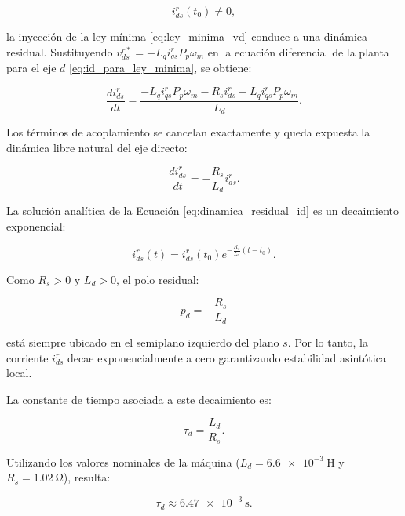 \documentclass[10pt,a4paper]{article}
\begin{document}
\begin{equation*}
    i_{ds}^r(t_0) \neq 0,
\end{equation*}

la inyección de la ley mínima \eqref{eq:ley_minima_vd} conduce a una dinámica residual. Sustituyendo $v_{ds}^{r*} = -L_q i_{qs}^r P_p \omega_m$ en la ecuación diferencial de la planta para el eje $d$ \eqref{eq:id_para_ley_minima}, se obtiene:

\begin{equation*}
	\frac{di_{ds}^{r}}{dt} = \frac{-L_q i_{qs}^r P_p \omega_m - R_s i_{ds}^r + L_q i_{qs}^r P_p \omega_m}{L_d}.
\end{equation*}

Los términos de acoplamiento se cancelan exactamente y queda expuesta la dinámica libre natural del eje directo:

\begin{equation}
    \boxed{ \frac{di_{ds}^{r}}{dt} = -\frac{R_s}{L_d}i_{ds}^r. }
    \label{eq:dinamica_residual_id}
\end{equation}

La solución analítica de la Ecuación \eqref{eq:dinamica_residual_id} es un decaimiento exponencial:

\begin{equation*}
    i_{ds}^r(t) = i_{ds}^r(t_0) e^{-\frac{R_s}{L_d}(t-t_0)}.
\end{equation*}

Como $R_s > 0$ y $L_d > 0$, el polo residual:

\begin{equation*}
    p_d = -\frac{R_s}{L_d}
\end{equation*}

está siempre ubicado en el semiplano izquierdo del plano $s$. 
Por lo tanto, la corriente $i_{ds}^r$ decae exponencialmente a cero garantizando estabilidad asintótica local.

La constante de tiempo asociada a este decaimiento es:

\begin{equation*}
    \tau_d = \frac{L_d}{R_s}.
\end{equation*}

Utilizando los valores nominales de la máquina ($L_d = \SI{6.6e-3}{\henry}$ y $R_s = \SI{1.02}{\ohm}$), resulta:

\begin{equation*}
    \tau_d \approx \SI{6.47e-3}{\second}.
\end{equation*}
\end{document}
